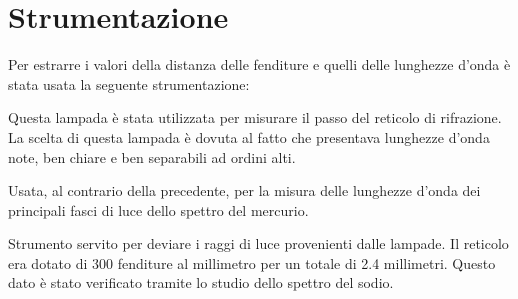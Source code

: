 \documentclass[a4paper,10pt]{article}
\begin{document}
	
	\section{Strumentazione}
	Per estrarre i valori della distanza delle fenditure e quelli delle lunghezze d'onda è stata usata la seguente strumentazione:
	\begin{description}[align=left]
		\item [Lampada al sodio] Questa lampada è stata utilizzata per misurare il passo del reticolo di rifrazione. La scelta di questa lampada è dovuta al fatto che presentava lunghezze d'onda note, ben chiare e ben separabili ad ordini alti.
		
		\item [Lampada al mercurio] Usata, al contrario della precedente, per la misura delle lunghezze d'onda dei principali fasci di luce dello spettro del mercurio. 
		
		\item [Un reticolo di diffrazione] Strumento servito per deviare i raggi di luce provenienti dalle lampade. Il reticolo era dotato di 300 fenditure al millimetro per un totale di 2.4 millimetri. Questo dato è stato verificato tramite lo studio dello spettro del sodio.
		

\end{description}
\end{document}
